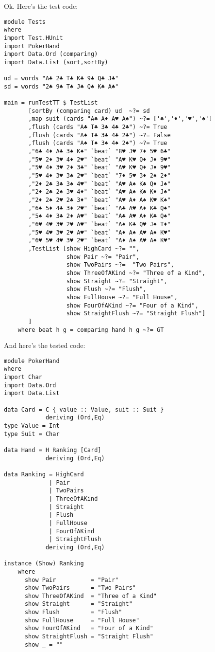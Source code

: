 \lhN Ok. Here's the test code:
\begin{lstlisting}[frame=single]
module Tests
where 
import Test.HUnit
import PokerHand
import Data.Ord (comparing)
import Data.List (sort,sortBy)

ud = words "A♣ 2♣ T♣ K♣ 9♣ Q♣ J♣"
sd = words "2♣ 9♣ T♣ J♣ Q♣ K♣ A♣"

main = runTestTT $ TestList 
       [sortBy (comparing card) ud  ~?= sd
       ,map suit (cards "A♣ A♦ A♥ A♠") ~?= ['♣','♦','♥','♠']
       ,flush (cards "A♣ T♣ 3♣ 4♣ 2♣") ~?= True
       ,flush (cards "A♠ T♣ 3♣ 4♣ 2♣") ~?= False
       ,flush (cards "A♠ T♠ 3♠ 4♠ 2♠") ~?= True
       ,"6♣ 4♦ A♣ 3♠ K♠" `beat` "8♥ J♥ 7♦ 5♥ 6♣"
       ,"5♥ 2♦ 3♥ 4♦ 2♥" `beat` "A♥ K♥ Q♦ J♦ 9♥"
       ,"5♥ 4♦ 3♥ 2♦ 3♣" `beat` "A♥ K♥ Q♦ J♦ 9♥"
       ,"5♥ 4♦ 3♥ 3♣ 2♥" `beat` "7♦ 5♥ 3♦ 2♠ 2♦"
       ,"2♦ 2♣ 3♣ 3♠ 4♥" `beat` "A♥ A♠ K♣ Q♦ J♠"  
       ,"2♦ 2♣ 2♠ 3♥ 4♦" `beat` "A♥ A♠ K♣ K♦ J♠"
       ,"2♦ 2♠ 2♥ 2♣ 3♦" `beat` "A♥ A♦ A♠ K♥ K♠"
       ,"6♠ 5♦ 4♣ 3♦ 2♥" `beat` "A♣ A♥ A♦ K♣ Q♠"
       ,"5♠ 4♦ 3♣ 2♦ A♥" `beat` "A♣ A♥ A♦ K♣ Q♠"
       ,"6♥ 4♥ 3♥ 2♥ A♥" `beat` "A♠ K♣ Q♥ J♠ T♦"
       ,"5♥ 4♥ 3♥ 2♥ A♥" `beat` "A♦ A♠ A♥ A♠ K♥"
       ,"6♥ 5♥ 4♥ 3♥ 2♥" `beat` "A♦ A♠ A♥ A♠ K♥"
       ,TestList [show HighCard ~?= "",
                  show Pair ~?= "Pair",
                  show TwoPairs ~?=  "Two Pairs",
                  show ThreeOfAKind ~?= "Three of a Kind",
                  show Straight ~?= "Straight",
                  show Flush ~?= "Flush",
                  show FullHouse ~?= "Full House",
                  show FourOfAKind ~?= "Four of a Kind",
                  show StraightFlush ~?= "Straight Flush"] 
       ]
    where beat h g = comparing hand h g ~?= GT
\end{lstlisting} %
\lhA And here's the tested code:
\begin{lstlisting}[frame=single]
module PokerHand
where
import Char
import Data.Ord
import Data.List

data Card = C { value :: Value, suit :: Suit } 
            deriving (Ord,Eq)
type Value = Int
type Suit = Char

data Hand = H Ranking [Card]
            deriving (Ord,Eq)

data Ranking = HighCard
             | Pair
             | TwoPairs
             | ThreeOfAKind
             | Straight
             | Flush
             | FullHouse
             | FourOfAKind
             | StraightFlush
            deriving (Ord,Eq)

instance (Show) Ranking
    where
      show Pair          = "Pair" 
      show TwoPairs      = "Two Pairs" 
      show ThreeOfAKind  = "Three of a Kind" 
      show Straight      = "Straight" 
      show Flush         = "Flush" 
      show FullHouse     = "Full House" 
      show FourOfAKind   = "Four of a Kind"
      show StraightFlush = "Straight Flush"
      show _ = ""
\end{lstlisting}
